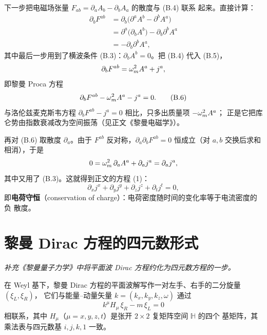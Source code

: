 下一步把电磁场张量 $F_{ab}=\partial_{a}A_{b}-\partial_{b}A_{a}$ 的散度与 (B.4) 联系
起来。直接计算：
\begin{align}
\partial_{b}F^{ab}
&=\partial_{b}\bigl(\partial^{a}A^{b}-\partial^{b}A^{a}\bigr)\nonumber\\
&=\partial^{a}\bigl(\partial_{b}A^{b}\bigr)-\partial_{b}\partial^{b}A^{a}\nonumber\\
&=-\partial_{b}\partial^{b}A^{a},
\tag{B.5}
\end{align}
其中最后一步用到了横波条件 (B.3)：$\partial_{b}A^{b}=0$。把 (B.4) 代入 (B.5)，
\begin{equation}
\partial_{b}F^{ab}=\omega_m^{2}A^{a}+j^{a},
\end{equation}
即黎曼 Proca 方程
\begin{equation}
\partial_{b}F^{ab}-\omega_m^{2}A^{a}-j^{a}=0 . \tag{B.6}
\end{equation}
与洛伦兹麦克斯韦方程 $\partial_{b}F^{ab}-j^{a}=0$ 相比，只多出质量项 $-\omega_m^{2}A^{a}$；
正是它把库仑势由指数衰减改为空间振荡（见正文《黎曼电磁学》）。

再对 (B.6) 取散度 $\partial_{a}$。由于 $F^{ab}$ 反对称，$\partial_{a}\partial_{b}F^{ab}=0$
恒成立（对 $a,b$ 交换后求和相消），于是
\begin{equation}
0=\omega_m^{2}\,\partial_{a}A^{a}+\partial_{a}j^{a}=\partial_{a}j^{a},
\end{equation}
其中又用了 (B.3)。这就得到正文的方程 (1)：
\begin{equation}
\partial_{x}j^{x}+\partial_{y}j^{y}+\partial_{z}j^{z}+\partial_{t}j^{t}=0,
\end{equation}
即\textbf{电荷守恒}（conservation of charge）：电荷密度随时间的变化率等于电流密度的负
散度。

\section{黎曼 Dirac 方程的四元数形式}
\emph{补充《黎曼量子力学》中将平面波 Dirac 方程约化为四元数方程的一步。}

在 Weyl 基下，黎曼 Dirac 方程的平面波解写作一对左手、右手的二分旋量 $(\xi_{L},\xi_{R})$，
它们与能量--动量矢量 $k=(k_x,k_y,k_z,\omega)$ 通过
\begin{equation}
k^{\mu}H_{\mu}\,\xi_{R}-m\,\xi_{L}=0
\tag{B.7}
\end{equation}
相联系，其中 $H_{\mu}$（$\mu=x,y,z,t$）是张开 $2\times2$ 复矩阵空间 $\mathbb{H}$ 的四个
基矩阵，其乘法表与四元数基 $i,j,k,1$ 一致。

